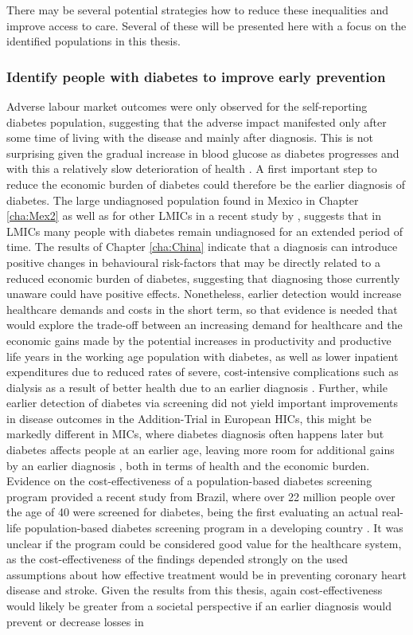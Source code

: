 There may be several potential strategies how to reduce these inequalities and improve access to care. Several of these will be presented here with a focus on the identified populations in this thesis.

\subsubsection*{Identify people with diabetes to improve early prevention}

Adverse labour market outcomes were only observed for the self-reporting diabetes population, suggesting that the adverse impact manifested only after some time of living with the disease and mainly after diagnosis. This is not surprising given the gradual increase in blood glucose as diabetes progresses and with this a relatively slow deterioration of health \parencite{Bertram2010}. A first important step to reduce the economic burden of diabetes could therefore be the earlier diagnosis of diabetes. The large undiagnosed population found in Mexico in Chapter \ref{cha:Mex2} as well as for other \acp{LMIC} in a recent study by \textcite{Beagley2014}, suggests that in \acp{LMIC} many people with diabetes remain undiagnosed for an extended period of time. The results of Chapter \ref{cha:China} indicate that a diagnosis can introduce positive changes in behavioural risk-factors that may be directly related to a reduced economic burden of diabetes, suggesting that diagnosing those currently unaware could have positive effects. Nonetheless, earlier detection would increase healthcare demands and costs in the short term, so that evidence is needed that would explore the trade-off between an increasing demand for healthcare and the economic gains made by the potential increases in productivity and productive life years in the working age population with diabetes, as well as lower inpatient expenditures due to reduced rates of severe, cost-intensive complications such as dialysis as a result of better health due to an earlier diagnosis \parencite{Engelgau2012}. Further, while earlier detection of diabetes via screening did not yield important improvements in disease outcomes in the Addition-Trial in European \acp{HIC}, this might be markedly different in \acp{MIC}, where diabetes diagnosis often happens later but diabetes affects people at an earlier age, leaving more room for additional gains by an earlier diagnosis \parencite{Choukem2013}, both in terms of health and the economic burden.  Evidence on the cost-effectiveness of a population-based diabetes screening program provided a recent study from Brazil, where over 22 million people over the age of 40 were screened for diabetes, being the first evaluating an actual real-life population-based diabetes screening program in a developing country \parencite{Toscano2015}. It was unclear if the program could be considered good value for the healthcare system, as the cost-effectiveness of the findings depended strongly on the used assumptions about how effective treatment would be in preventing coronary heart disease and stroke. Given the results from this thesis, again cost-effectiveness would likely be greater from a societal perspective if an earlier diagnosis would prevent or decrease losses in 